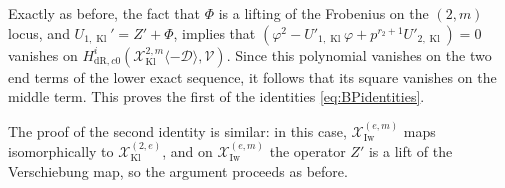 \documentclass[cjm]{ipart}
\theoremstyle{plain}
\newtheorem{lemma}[theorem]{Lemma}
\theoremstyle{remark}
\DeclareMathOperator{\Iw}{Iw}
\DeclareMathOperator{\Kl}{Kl}
\newcommand{\cD}{\mathcal{D}}
\newcommand{\cV}{\mathcal{V}}
\newcommand{\cX}{\mathcal{X}}
\newcommand{\dR}{\mathrm{dR}}
\newcommand{\res}{\mathrm{res}}
\numberwithin{equation}{subsection}
\renewcommand{\emptyset}{\varnothing}
\begin{document}
  Exactly as before, the fact that $\Phi$ is a lifting of the Frobenius on the $(2, m)$ locus, and $U_{1, \Kl}' = Z' + \Phi$, implies that $\left(\varphi^2 - U'_{1, \Kl} \varphi + p^{r_2 + 1} U'_{2, \Kl}\right) = 0$ vanishes on $H^i_{\dR,c0} (\cX^{2, m}_{\Kl}\langle -\cD\rangle, \cV)$. Since this polynomial vanishes on the two end terms of the lower exact sequence, it follows that its square vanishes on the middle term. This proves the first of the identities \eqref{eq:BPidentities}.

  The proof of the second identity is similar: in this case, $\cX^{(e,m)}_{\Iw}$ maps isomorphically to $\cX^{(2, e)}_{\Kl}$, and on $\cX^{(e,m)}_{\Iw}$ the operator $Z'$ is a lift of the Verschiebung map, so the argument proceeds as before.

%
%
%
%
\end{document}
